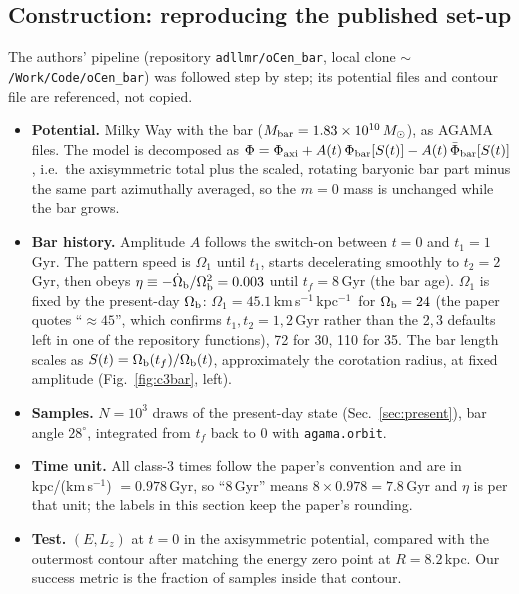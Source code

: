 \documentclass[11pt,a4paper]{article}
\newcommand{\kms}{km\,s$^{-1}$}
\newcommand{\kmskpc}{km\,s$^{-1}$\,kpc$^{-1}$}
\newcommand{\Msun}{M_\odot}
\newcommand{\Lz}{L_z}
\newcommand{\Ob}{\Omega_{\rm b}}
\begin{document}
\subsection{Construction: reproducing the published set-up}
The authors' pipeline (repository \texttt{adllmr/oCen\_bar}, local clone
\texttt{$\sim$/Work/Code/oCen\_bar}) was followed step by step; its potential files and contour
file are referenced, not copied.
\begin{itemize}
\item \textbf{Potential.} \citet{hunter2024} Milky Way with the \citet{sormani2022} bar
  ($M_{\rm bar}=1.83\times10^{10}\,\Msun$), as AGAMA files. The model is decomposed as
  $\Phi=\Phi_{\rm axi}+A(t)\,\Phi_{\rm bar}[S(t)]-A(t)\,\bar\Phi_{\rm bar}[S(t)]$, i.e.\ the
  axisymmetric total plus the scaled, rotating baryonic bar part minus the same part
  azimuthally averaged, so the $m=0$ mass is unchanged while the bar grows.
\item \textbf{Bar history.} Amplitude $A$ follows the \citet{dehnen2000} switch-on between
  $t=0$ and $t_1=1$\,Gyr. The pattern speed is $\Omega_1$ until $t_1$, starts decelerating
  smoothly to $t_2=2$\,Gyr, then obeys $\eta\equiv-\dot\Ob/\Ob^2=0.003$ until
  $t_f=8$\,Gyr (the bar age). $\Omega_1$ is fixed by the present-day $\Ob$:
  $\Omega_1=45.1$\,\kmskpc\ for $\Ob=24$ (the paper quotes ``$\approx45$'', which confirms
  $t_1,t_2=1,2$\,Gyr rather than the 2,\,3 defaults left in one of the repository functions),
  72 for 30, 110 for 35. The bar length scales as $S(t)=\Ob(t_f)/\Ob(t)$, approximately the
  corotation radius, at fixed amplitude (Fig.~\ref{fig:c3bar}, left).
\item \textbf{Samples.} $N=10^3$ draws of the present-day state (Sec.~\ref{sec:present}),
  bar angle $28^\circ$, integrated from $t_f$ back to 0 with \texttt{agama.orbit}.
\item \textbf{Time unit.} All class-3 times follow the paper's convention and are in
  kpc/(\kms) $=0.978$\,Gyr, so ``8\,Gyr'' means $8\times0.978=7.8$\,Gyr and $\eta$ is per
  that unit; the labels in this section keep the paper's rounding.
\item \textbf{Test.} $(E,\Lz)$ at $t=0$ in the axisymmetric potential, compared with the
  outermost \citet{belokurov2023} contour after matching the energy zero point at
  $R=8.2$\,kpc. Our success metric is the fraction of samples inside that contour.
\end{itemize}
\end{document}
